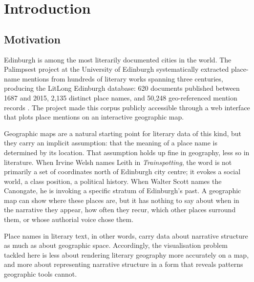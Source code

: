 \documentclass[logo,msc]{infthesis}
\begin{document}
\begin{preliminary}
\begin{acknowledgements}
\end{acknowledgements}
 
\tableofcontents
\listoffigures
 
\end{preliminary}
 
 
\chapter{Introduction}
\label{chap:intro}

\section{Motivation}
 
Edinburgh is among the most literarily documented cities in the world. The Palimpsest project at the University of Edinburgh systematically extracted place-name mentions from hundreds of literary works spanning three centuries, producing the LitLong Edinburgh database: 620 documents published between 1687 and 2015, 2,135 distinct place names, and 50,248 geo-referenced mention records \cite{anderson2016}. The project made this corpus publicly accessible through a web interface that plots place mentions on an interactive geographic map.
 
Geographic maps are a natural starting point for literary data of this kind, but they carry an implicit assumption: that the meaning of a place name is determined by its location. That assumption holds up fine in geography, less so in literature. When Irvine Welsh names Leith in \textit{Trainspotting}, the word is not primarily a set of coordinates north of Edinburgh city centre; it evokes a social world, a class position, a political history. When Walter Scott names the Canongate, he is invoking a specific stratum of Edinburgh's past. A geographic map can show where these places are, but it has nothing to say about when in the narrative they appear, how often they recur, which other places surround them, or whose authorial voice chose them.

Place names in literary text, in other words, carry data about narrative structure as much as about geographic space. Accordingly, the visualisation problem tackled here is less about rendering literary geography more accurately on a map, and more about representing narrative structure in a form that reveals patterns geographic tools cannot.
 
\end{document}
